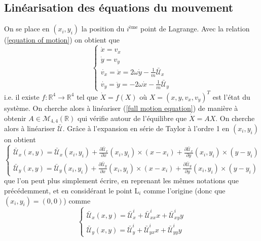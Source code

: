 \documentclass[12pt]{article}
\begin{document}
	\subsection{Linéarisation des équations du mouvement}
	On se place en $(x_i,y_i)$ la position du $i^{\text{ème}}$ point de Lagrange. Avec la relation (\ref{equation of motion}) on obtient que
	\begin{equation}
		\label{full motion equation}
		\begin{cases}
			\dot{x} = v_x
			\\
			\dot{y} = v_y
			\\
			\dot{v_x} = \ddot{x} = 2\omega\dot{y} - \frac{1}{m}\bar{\mathcal{U}}_x
			\\
			\dot{v_y} = \ddot{y} = - 2\omega\dot{x} - \frac{1}{m}\bar{\mathcal{U}}_y
		\end{cases}
	\end{equation}
	i.e. il existe $f: \mathbb{R}^4 \longrightarrow \mathbb{R}^4$ tel que $\dot{X} = f(X)$ où $X = (x,y,v_x,v_y)^T$ est l'état du système. On cherche alors à linéariser (\ref{full motion equation}) de manière à obtenir $A \in \mathcal{M}_{4,4}(\mathbb{R})$ qui vérifie autour de l'équilibre que $\dot{X} = AX$. On cherche alors à linéariser $\bar{\mathcal{U}}$. Grâce à l'expansion en série de Taylor à l'ordre 1 en $(x_i,y_i)$ on obtient
	\begin{equation}
		\begin{cases}
			\bar{\mathcal{U}}_x(x,y) = \bar{\mathcal{U}}_x(x_i,y_i) + \frac{\partial \bar{\mathcal{U}}_x}{\partial x} (x_i,y_i) \times (x - x_i) + \frac{\partial \bar{\mathcal{U}}_x}{\partial y} (x_i,y_i) \times (y - y_i)
			\\
			\bar{\mathcal{U}}_y(x,y) = \bar{\mathcal{U}}_y(x_i,y_i) + \frac{\partial \bar{\mathcal{U}}_y}{\partial x} (x_i,y_i) \times (x - x_i) + \frac{\partial \bar{\mathcal{U}}_y}{\partial y} (x_i,y_i) \times (y - y_i)
		\end{cases}
	\end{equation}
	que l'on peut plus simplement écrire, en reprenant les mêmes notations que précédemment, et en considérant le point L$_i$ comme l'origine (donc que $(x_i,y_i)=(0,0)$) comme
		\begin{equation}
		\begin{cases}
			\bar{\mathcal{U}}_x(x,y) = \bar{\mathcal{U}}_x^i + 
			\bar{\mathcal{U}}_{xx}^i x + 
			\bar{\mathcal{U}}_{xy}^i y
			\\
			\bar{\mathcal{U}}_y(x,y) = \bar{\mathcal{U}}_y^i +  
			\bar{\mathcal{U}}_{yx}^{i} x + 
			\bar{\mathcal{U}}_{yy}^{i} y
		\end{cases}
	\end{equation}
	
\end{document}
